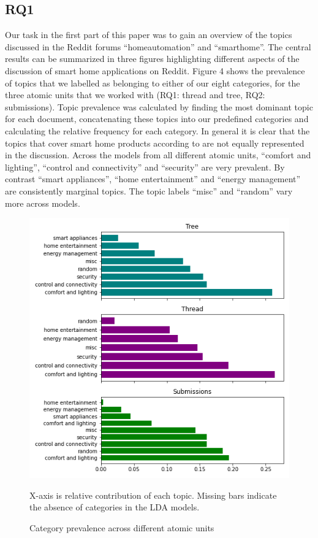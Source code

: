 \documentclass{article}
\begin{document}
    \subsection{RQ1}
    Our task in the first part of this paper was to gain an overview of the topics discussed in the Reddit forums “homeautomation” and “smarthome”. The central results can be summarized in three figures highlighting different aspects of the discussion of smart home applications on Reddit. Figure 4 shows the prevalence of topics that we labelled as belonging to either of our eight categories, for the three atomic units that we worked with (RQ1: thread and tree, RQ2: submissions). Topic prevalence was calculated by finding the most dominant topic for each document, concatenating these topics into our predefined categories and calculating the relative frequency for each category. In general it is clear that the topics that cover smart home products according to  are not equally represented in the discussion. Across the models from all different atomic units, “comfort and lighting”, “control and connectivity” and “security” are very prevalent. By contrast “smart appliances”, “home entertainment” and “energy management” are consistently marginal topics. The topic labels “misc” and “random” vary more across models. 
    
    \begin{figure}[H]
        \begin{centering}
        \includegraphics[scale=0.5]{../Figure/Topic_Prevalence.png}
        \caption{Category prevalence across different atomic units}
        \end{centering}
        \begin{footnotesize} 
            X-axis is relative contribution of each topic. Missing bars indicate the absence of categories in the LDA models. 
        \end{footnotesize}
    \end{figure}
    
\end{document}
